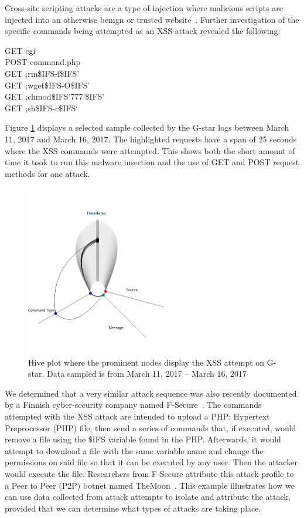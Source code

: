 Cross-site scripting attacks are a type of injection where malicious scripts are injected into an otherwise benign or trusted website~\cite{XSS-def}. 
Further investigation of the specific commands being attempted as an XSS attack revealed the following:

\noindent GET cgi\\
POST command.php\\
GET ;rm\$IFS-f\$IFS’\\
GET ;wget\$IFS-O\$IFS’\\
GET ;chmod\$IFS’777’\$IFS’\\
GET ;sh\$IFS-c\$IFS‘

\noindent Figure \ref{fig:XSS} displays a selected sample collected by the G-star logs between March 11, 2017 and March 16, 2017. 
The highlighted requests have a span of 25 seconds where the XSS commands were attempted.
This shows both the short amount of time it took to run this malware insertion and the use of GET and POST request methods for one attack.

\begin{figure}[t]
   \centering
   \includegraphics[width=2.5in]{images/XSS.png}  
   \caption{Hive plot where the prominent nodes display the XSS attempt on G-star. Data sampled is from March 11, 2017 -- March 16, 2017}
   \label{fig:XSS}
\end{figure}

We determined that a very similar attack sequence was also recently documented by a Finnish cyber-security company named F-Secure~\cite{F-Secure}. 
The commands attempted with the XSS attack are intended to upload a PHP: Hypertext Preprocessor (PHP) file, then send a series of commands that, if executed, would remove a file using the \$IFS variable found in the PHP. 
Afterwards, it would attempt to download a file with the same variable name and change the permissions on said file so that it can be executed by any user.  
Then the attacker would execute the file. 
Researchers from F-Secure  attribute this attack profile to a Peer to Peer (P2P) botnet named TheMoon~\cite{TheMoon}. 
This example illustrates how we can use data collected from attack attempts to isolate and attribute the attack, provided that we can determine what types of attacks are taking place.

